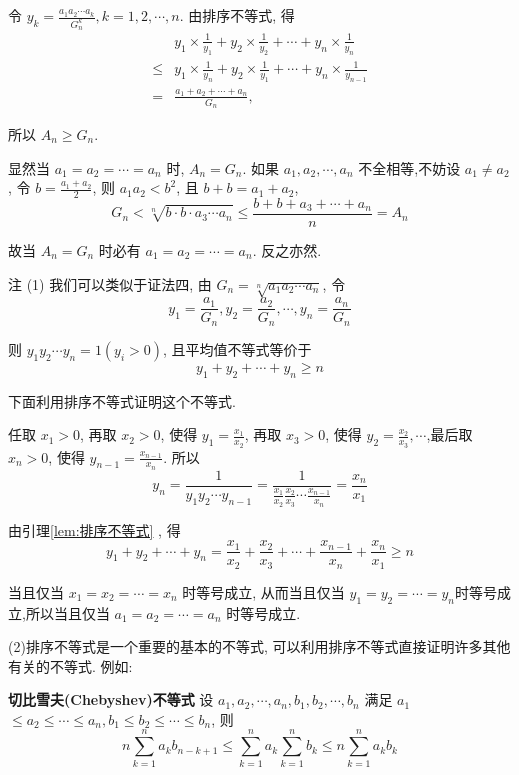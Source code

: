 令 $y_{k}=\frac{a_{1} a_{2} \cdots a_{k}}{G_{n}^{k}}, k=1,2, \cdots, n$. 由排序不等式, 得
$$
\begin{aligned}
& y_{1} \times \frac{1}{y_{1}}+y_{2} \times \frac{1}{y_{2}}+\cdots+y_{n} \times \frac{1}{y_{n}} \\
\leqslant & y_{1} \times \frac{1}{y_{n}}+y_{2} \times \frac{1}{y_{1}}+\cdots+y_{n} \times \frac{1}{y_{n-1}} \\
= & \frac{a_{1}+a_{2}+\cdots+a_{n}}{G_{n}},
\end{aligned}
$$

所以 $A_{n} \geqslant G_{n}$.

显然当 $a_{1}=a_{2}=\cdots=a_{n}$ 时, $A_{n}=G_{n}$. 如果 $a_{1}, a_{2}, \cdots, a_{n}$ 不全相等,不妨设 $a_{1} \neq a_{2}$, 令 $b=\frac{a_{1}+a_{2}}{2}$, 则 $a_{1} a_{2}<b^{2}$, 且 $b+b=a_{1}+a_{2}$,
$$
G_{n}<\sqrt[n]{b \cdot b \cdot a_{3} \cdots a_{n}} \leqslant \frac{b+b+a_{3}+\cdots+a_{n}}{n}=A_{n}
$$

故当 $A_{n}=G_{n}$ 时必有 $a_{1}=a_{2}=\cdots=a_{n}$. 反之亦然.

注 (1) 我们可以类似于证法四, 由 $G_{n}=\sqrt[n]{a_{1} a_{2} \cdots a_{n}}$, 令
$$
y_{1}=\frac{a_{1}}{G_{n}}, y_{2}=\frac{a_{2}}{G_{n}}, \cdots, y_{n}=\frac{a_{n}}{G_{n}}
$$

则 $y_{1} y_{2} \cdots y_{n}=1\left(y_{i}>0\right)$, 且平均值不等式等价于
$$
y_{1}+y_{2}+\cdots+y_{n} \geqslant n
$$

下面利用排序不等式证明这个不等式.

任取 $x_{1}>0$, 再取 $x_{2}>0$, 使得 $y_{1}=\frac{x_{1}}{x_{2}}$, 再取 $x_{3}>0$, 使得 $y_{2}=\frac{x_{2}}{x_{3}}, \cdots$,最后取 $x_{n}>0$, 使得 $y_{n-1}=\frac{x_{n-1}}{x_{n}}$. 所以
$$
y_{n}=\frac{1}{y_{1} y_{2} \cdots y_{n-1}}=\frac{1}{\frac{x_{1}}{x_{2}} \frac{x_{2}}{x_{3}} \cdots \frac{x_{n-1}}{x_{n}}}=\frac{x_{n}}{x_{1}}
$$

由引理\ref{lem:排序不等式} , 得
$$
y_{1}+y_{2}+\cdots+y_{n}=\frac{x_{1}}{x_{2}}+\frac{x_{2}}{x_{3}}+\cdots+\frac{x_{n-1}}{x_{n}}+\frac{x_{n}}{x_{1}} \geqslant n
$$

当且仅当 $x_{1}=x_{2}=\cdots=x_{n}$ 时等号成立, 从而当且仅当 $y_{1}=y_{2}=\cdots=y_{n}$时等号成立,所以当且仅当 $a_{1}=a_{2}=\cdots=a_{n}$ 时等号成立.

(2)排序不等式是一个重要的基本的不等式, 可以利用排序不等式直接证明许多其他有关的不等式. 例如:

\textbf{切比雪夫(Chebyshev)不等式} \quad 设 $a_{1}, a_{2}, \cdots, a_{n}, b_{1}, b_{2}, \cdots, b_{n}$ 满足 $a_{1}$ $\leqslant a_{2} \leqslant \cdots \leqslant a_{n}, b_{1} \leqslant b_{2} \leqslant \cdots \leqslant b_{n}$, 则
$$
n \sum_{k=1}^{n} a_{k} b_{n-k+1} \leqslant \sum_{k=1}^{n} a_{k} \sum_{k=1}^{n} b_{k} \leqslant n \sum_{k=1}^{n} a_{k} b_{k}
$$

